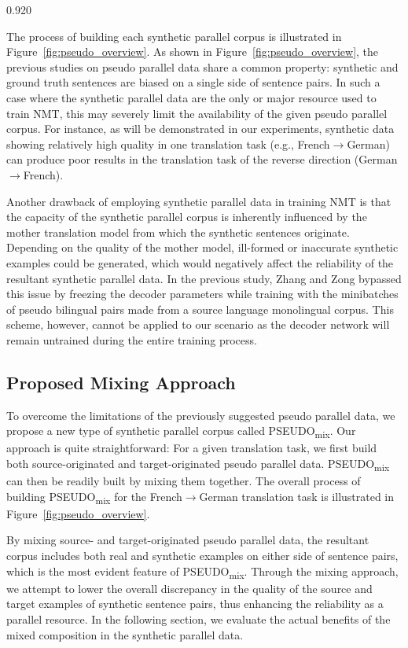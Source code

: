 \documentclass[11pt,letterpaper]{article}
\newcommand{\mylinespacing}{0.920}
\begin{document}
\begin{spacing}{\mylinespacing}
\begin{enumerate}[label=(\alph*)]
\end{enumerate}

The process of building each synthetic parallel corpus is illustrated in Figure~\ref{fig:pseudo_overview}. As shown in Figure~\ref{fig:pseudo_overview}, the previous studies on pseudo parallel data share a common property: synthetic and ground truth sentences are biased on a single side of sentence pairs. In such a case where the synthetic parallel data are the only or major resource used to train NMT, this may severely limit the availability of the given pseudo parallel corpus. For instance, as will be demonstrated in our experiments, synthetic data showing relatively high quality in one translation task (e.g., French\(\rightarrow\)German) can produce poor results in the translation task of the reverse direction (German\(\rightarrow\)French).

Another drawback of employing synthetic parallel data in training NMT is that the capacity of the synthetic parallel corpus is inherently influenced by the mother translation model from which the synthetic sentences originate. Depending on the quality of the mother model, ill-formed or inaccurate synthetic examples could be generated, which would negatively affect the reliability of the resultant synthetic parallel data. In the previous study, Zhang and Zong  bypassed this issue by freezing the decoder parameters while training with the minibatches of pseudo bilingual pairs made from a source language monolingual corpus. This scheme, however, cannot be applied to our scenario as the decoder network will remain untrained during the entire training process.

\subsection{Proposed Mixing Approach}
To overcome the limitations of the previously suggested pseudo parallel data, we propose a new type of synthetic parallel corpus called PSEUDO\textsubscript{mix}. Our approach is quite straightforward: For a given translation task, we first build both source-originated and target-originated pseudo parallel data. PSEUDO\textsubscript{mix} can then be readily built by mixing them together. The overall process of building PSEUDO\textsubscript{mix} for the French\(\rightarrow\)German translation task is illustrated in Figure~\ref{fig:pseudo_overview}.

By mixing source- and target-originated pseudo parallel data, the resultant corpus includes both real and synthetic examples on either side of sentence pairs, which is the most evident feature of PSEUDO\textsubscript{mix}. Through the mixing approach, we attempt to lower the overall discrepancy in the quality of the source and target examples of synthetic sentence pairs, thus enhancing the reliability as a parallel resource. In the following section, we evaluate the actual benefits of the mixed composition in the synthetic parallel data.



\end{spacing}
\end{document}
